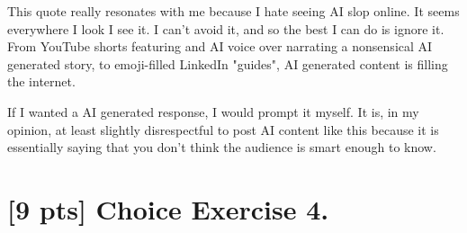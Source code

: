 \documentclass{article}
\begin{document}
\begin{enumerate}
{        This quote really resonates with me because I hate seeing AI slop online. 
        It seems everywhere I look I see it. I can't avoid it, and so the best I 
        can do is ignore it. From YouTube shorts featuring and AI voice over 
        narrating a nonsensical AI generated story, to emoji-filled LinkedIn 
        "guides", AI generated content is filling the internet. 

        If I wanted a AI generated response, I would prompt it myself. It is, in 
        my opinion, at least slightly disrespectful to post AI content like 
        this because it is essentially saying that you don't think the audience 
        is smart enough to know.
    }
\end{enumerate}

\section*{[9 pts] Choice Exercise 4.}
\end{document}
